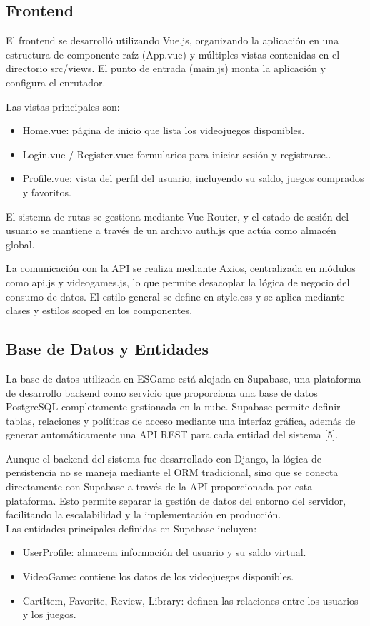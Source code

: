 \documentclass[conference]{IEEEtran}
\begin{document}
\subsection{Frontend}
El frontend se desarrolló utilizando Vue.js, organizando la aplicación en una estructura de componente raíz (App.vue) y múltiples vistas contenidas en el directorio src/views. El punto de entrada (main.js) monta la aplicación y configura el enrutador.

Las vistas principales son:
\begin{itemize}
	\item Home.vue: página de inicio que lista los videojuegos disponibles.
	\item Login.vue / Register.vue: formularios para iniciar sesión y registrarse..
	\item Profile.vue: vista del perfil del usuario, incluyendo su saldo, juegos comprados y favoritos.
\end{itemize}

El sistema de rutas se gestiona mediante Vue Router, y el estado de sesión del usuario se mantiene a través de un archivo auth.js que actúa como almacén global.

La comunicación con la API se realiza mediante Axios, centralizada en módulos como api.js y videogames.js, lo que permite desacoplar la lógica de negocio del consumo de datos. El estilo general se define en style.css y se aplica mediante clases y estilos scoped en los componentes.
\subsection{Base de Datos y Entidades}
La base de datos utilizada en ESGame está alojada en Supabase, una plataforma de desarrollo backend como servicio que proporciona una base de datos PostgreSQL completamente gestionada en la nube. Supabase permite definir tablas, relaciones y políticas de acceso mediante una interfaz gráfica, además de generar automáticamente una API REST para cada entidad del sistema [5].

Aunque el backend del sistema fue desarrollado con Django, la lógica de persistencia no se maneja mediante el ORM tradicional, sino que se conecta directamente con Supabase a través de la API proporcionada por esta plataforma. Esto permite separar la gestión de datos del entorno del servidor, facilitando la escalabilidad y la implementación en producción.	\\

Las entidades principales definidas en Supabase incluyen:
\begin{itemize}
	\item UserProfile: almacena información del usuario y su saldo virtual.
	\item VideoGame: contiene los datos de los videojuegos disponibles.
	\item CartItem, Favorite, Review, Library: definen las relaciones entre los usuarios y los juegos.
\end{itemize}
\end{document}
